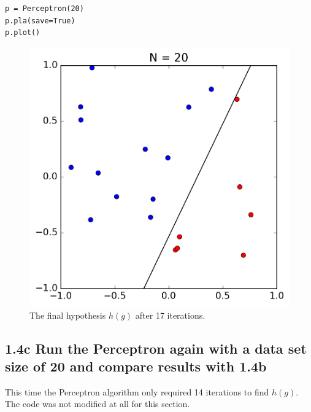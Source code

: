 \documentclass[11pt]{article}
\begin{document}
\begin{lstlisting}[frame=single]
p = Perceptron(20)
p.pla(save=True)
p.plot()
\end{lstlisting}

\begin{figure}[!htb]
	\includegraphics{14b.png}
	\caption{The final hypothesis $h(g)$ after 17 iterations.}
\end{figure}
\newpage

\subsection*{1.4c Run the Perceptron again with a data set size of 20 and compare results with 1.4b}

This time the Perceptron algorithm only required 14 iterations to find $h(g)$. The code was not modified at all for this section.
\end{document}
